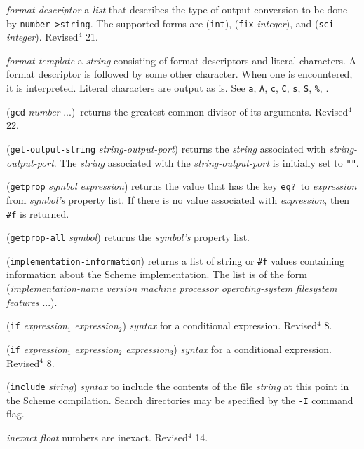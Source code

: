 \documentclass[10pt,twocolumn]{article}
\begin{document}
\emph{format descriptor} a \emph{list} that describes the type of output
conversion to be done by \texttt{number->string}.  The supported forms are
(\texttt{int}), (\texttt{fix} \emph{integer}), and (\texttt{sci} \emph{integer}).
Revised$^4$ 21.

\emph{format-template} a \emph{string} consisting of format descriptors and
literal characters.  A format descriptor is \texttt{\texttildelow} followed by some
other character.  When one is encountered, it is interpreted.  Literal
characters are output as is.  See \texttt{\texttildelow{}a}, \texttt{\texttildelow{}A}, \texttt{\texttildelow{}c}, \texttt{\texttildelow{}C},
\texttt{\texttildelow{}s}, \texttt{\texttildelow{}S}, \texttt{\texttildelow\%}, \texttt{\texttildelow\texttildelow}.

(\texttt{gcd} \emph{number} ...)\ returns the greatest common divisor of its
arguments.  Revised$^4$ 22.

(\texttt{get-output-string} \emph{string-output-port}) returns the \emph{string}
associated with \emph{string-output-port}.  The \emph{string} associated
with the \emph{string-output-port} is initially set to \texttt{""}.

(\texttt{getprop} \emph{symbol} \emph{expression}) returns the value that has
the key \texttt{eq?}\ to \emph{expression} from \emph{symbol's} property list.  If
there is no value associated with \emph{expression}, then \texttt{\#f} is
returned.

(\texttt{getprop-all} \emph{symbol}) returns the \emph{symbol's} property list.

(\texttt{implementation-information}) returns a list of string or
\texttt{\#f} values containing information about the Scheme
implementation.  The list is of the form
(\emph{implementation-name} \emph{version} \emph{machine} \emph{processor}
\emph{operating-system} \emph{filesystem} \emph{features} ...).

(\texttt{if} \emph{expression}$_1$ \emph{expression}$_2$) \emph{syntax} for a
conditional expression.  Revised$^4$ 8.

(\texttt{if} \emph{expression}$_1$ \emph{expression}$_2$ \emph{expression}$_3$)
\emph{syntax} for a conditional expression.  Revised$^4$ 8.

(\texttt{include} \emph{string}) \emph{syntax} to include the contents of the
file \emph{string} at this point in the Scheme compilation.
Search directories may be specified by the \texttt{-I} command flag.

\emph{inexact} \qquad \emph{float} numbers are inexact.  Revised$^4$ 14.
\end{document}
